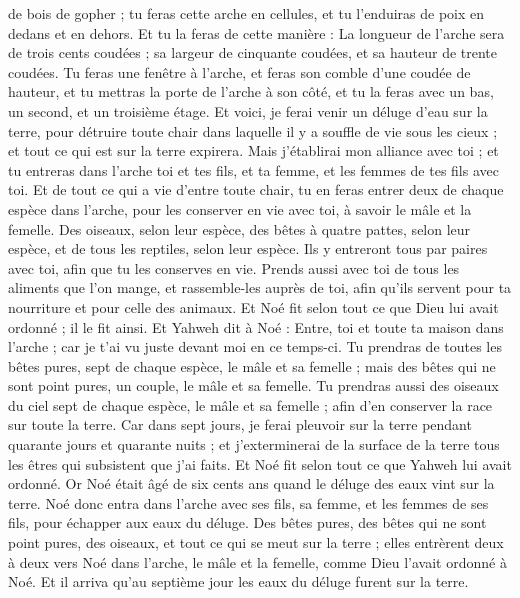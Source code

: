 \begin{multicols}{2}
{} de bois de gopher ; tu feras cette arche en cellules, et tu l'enduiras de poix en dedans et en dehors.
Et tu la feras de cette manière : La longueur de l'arche sera de trois cents coudées ; sa largeur de cinquante coudées, et sa hauteur de trente coudées.
Tu feras une fenêtre à l'arche, et feras son comble d'une coudée de hauteur, et tu mettras la porte de l'arche à son côté, et tu la feras avec un bas, un second, et un troisième étage.
Et voici, je ferai venir un déluge d'eau sur la terre, pour détruire toute chair dans laquelle il y a souffle de vie sous les cieux ; et tout ce qui est sur la terre expirera.
Mais j'établirai mon alliance avec toi ; et tu entreras dans l'arche toi et tes fils, et ta femme, et les femmes de tes fils avec toi.
Et de tout ce qui a vie d'entre toute chair, tu en feras entrer deux de chaque espèce dans l'arche, pour les conserver en vie avec toi, à savoir le mâle et la femelle.
Des oiseaux, selon leur espèce, des bêtes à quatre pattes, selon leur espèce, et de tous les reptiles, selon leur espèce. Ils y entreront tous par paires avec toi, afin que tu les conserves en vie.
Prends aussi avec toi de tous les aliments que l'on mange, et rassemble-les auprès de toi, afin qu'ils servent pour ta nourriture et pour celle des animaux.
Et Noé fit selon tout ce que Dieu lui avait ordonné ; il le fit ainsi.
\VerseOne{}Et Yahweh dit à Noé : Entre, toi et toute ta maison dans l'arche ; car je t'ai vu juste devant moi en ce temps-ci. 
Tu prendras de toutes les bêtes pures, sept de chaque espèce, le mâle et sa femelle ; mais des bêtes qui ne sont point pures, un couple, le mâle et sa femelle.
Tu prendras aussi des oiseaux du ciel sept de chaque espèce, le mâle et sa femelle ; afin d'en conserver la race sur toute la terre.
Car dans sept jours, je ferai pleuvoir sur la terre pendant quarante jours et quarante nuits ; et j'exterminerai de la surface de la terre tous les êtres qui subsistent que j'ai faits.
Et Noé fit selon tout ce que Yahweh lui avait ordonné.
Or Noé était âgé de six cents ans quand le déluge des eaux vint sur la terre.
Noé donc entra dans l'arche avec ses fils, sa femme, et les femmes de ses fils, pour échapper aux eaux du déluge.
Des bêtes pures, des bêtes qui ne sont point pures, des oiseaux, et tout ce qui se meut sur la terre ;
elles entrèrent deux à deux vers Noé dans l'arche, le mâle et la femelle, comme Dieu l'avait ordonné à Noé.
Et il arriva qu'au septième jour les eaux du déluge furent sur la terre.

\end{multicols}
